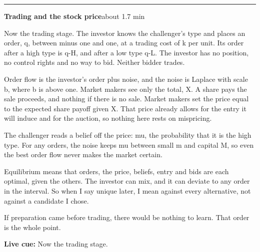 \documentclass[11pt]{article}
\newcommand{\Cue}[1]{\par\nobreak\smallskip\noindent
  \textcolor{ScriptGray}{\footnotesize\textbf{Live cue:} #1}\par}
\newcommand{\scriptframe}[3]{%
  \Needspace{9\baselineskip}%
  \par\medskip\noindent\textcolor{ScriptBlue}{\rule{\linewidth}{0.55pt}}%
  \par\smallskip\noindent
  \textbf{#1}\hfill\textcolor{ScriptGray}{\small #2}\par\smallskip
  #3\par}
\begin{document}
\scriptframe{Trading and the stock price}{about 1.7 min}{%
  Now the trading stage. The investor knows the challenger's type and places an
  order, q, between minus one and one, at a trading cost of k per unit. Its
  order after a high type is q-H, and after a low type q-L. The investor has no
  position, no control rights and no way to bid. Neither bidder trades.

  Order flow is the investor's order plus noise, and the noise is Laplace with
  scale b, where b is above one. Market makers see only the total, X. A share
  pays the sale proceeds, and nothing if there is no sale. Market makers set
  the price equal to the expected share payoff given X. That price already
  allows for the entry it will induce and for the auction, so nothing here
  rests on mispricing.

  The challenger reads a belief off the price: mu, the probability that it is
  the high type. For any orders, the noise keeps mu between small m and capital
  M, so even the best order flow never makes the market certain.

  Equilibrium means that orders, the price, beliefs, entry and bids are each
  optimal, given the others. The investor can mix, and it can deviate to any
  order in the interval. So when I say unique later, I mean against every
  alternative, not against a candidate I chose.

  If preparation came before trading, there would be nothing to learn. That
  order is the whole point.
  \Cue{Now the trading stage.}
}
\end{document}
